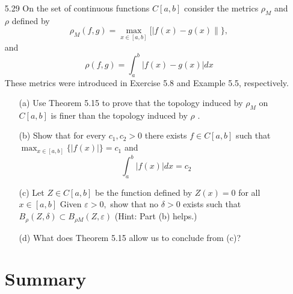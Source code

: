 \documentclass[12pt]{article}
\begin{document}
\begin{enumerate}
	\item[5.29] On the set of continuous functions $C [ a , b ]$ consider the metrics $\rho _ { M }$ and $\rho$ defined by
	\[\rho _ { M } ( f , g ) = \max _ { x \in [ a , b ] } [ | f ( x ) - g ( x ) \| \} ,\] and
	\[\rho ( f , g ) = \int _ { a } ^ { b } | f ( x ) - g ( x ) | d x\]
	These metrics were introduced in Exercise 5.8 and Example 5.5, respectively.
	\begin{enumerate}
		\item[(a)] Use Theorem 5.15 to prove that the topology induced by $\rho _ { M }$ on $C [ a , b ]$ is finer than the topology induced by $\rho$ .
		\item[(b)] Show that for every $c _ { 1 } , c _ { 2 } > 0$ there exists $f \in C [ a , b ]$ such that\\
		$\max _ { x \in [ a , b ] } \{ | f ( x ) | \} = c _ { 1 }$ and
		\[\int _ { a } ^ { b } | f ( x ) | d x = c _ { 2 }\]
		\item[(c)] Let $Z \in C [ a , b ]$ be the function defined by $Z ( x ) = 0$ for all $x \in [ a , b ]$
		Given $\varepsilon > 0 ,$ show that no $\delta > 0$ exists such that $B _ { \rho } ( Z , \delta ) \subset B _ { \rho M} ( Z , \varepsilon )$
		(Hint: Part (b) helps.)
		\item[(d)] What does Theorem 5.15 allow us to conclude from (c)?
	\end{enumerate}

	\section*{Summary}

\end{enumerate}
 
\end{document}
